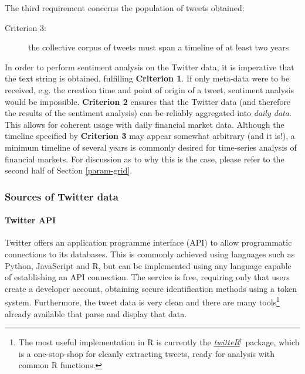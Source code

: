 \documentclass{article}
\begin{document}
The third requirement concerns the population of tweets obtained:

\begin{description}
\item[{Criterion 3:}] the collective corpus of tweets must span a timeline of at least two years
\end{description}

In order to perform sentiment analysis on the Twitter data, it is imperative that the text string is obtained, fulfilling \textbf{Criterion 1}. If only meta-data were to be received, e.g. the creation time and point of origin of a tweet, sentiment analysis would be impossible. \textbf{Criterion 2} ensures that the Twitter data (and therefore the results of the sentiment analysis) can be reliably aggregated into \emph{daily data}. This allows for coherent usage with daily financial market data. Although the timeline specified by \textbf{Criterion 3} may appear somewhat arbitrary (and it is!), a minimum timeline of several years is commonly desired for time-series analysis of financial markets. For discussion as to why this is the case, please refer to the second half of Section \ref{param-grid}.


\subsubsection{Sources of Twitter data \label{twitter-sources}}
\label{sec-3-2-3}


\paragraph{Twitter API}
\label{sec-3-2-3-1}
Twitter offers an application programme interface (API) to allow programmatic connections to its databases. This is commonly achieved using languages such as Python, JavaScript and R, but can be implemented using any language capable of establishing an API connection.
The service is free, requiring only that users create a developer account, obtaining secure identification methods using a token system. Furthermore, the tweet data is very clean and there are many tools\footnote{The most useful implementation in R is currently the \href{https://cran.r-project.org/web/packages/twitteR/index.html}{\emph{twitteR$^{\dag{}}$}} package, which is a one-stop-shop for cleanly extracting tweets, ready for analysis with common R functions.} already available that parse and display that data.
\end{document}
